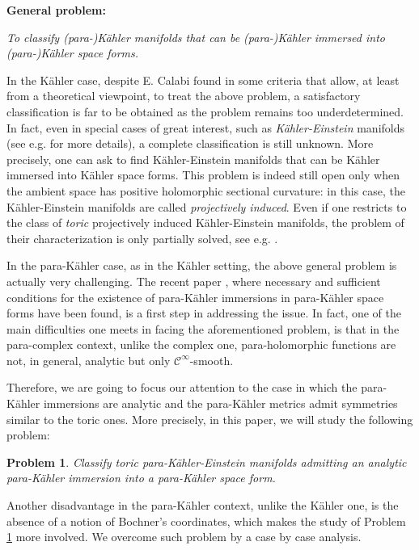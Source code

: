 \documentclass[11pt, reqno]{amsart}
\newtheorem{problem}{Problem}
\newcommand{\de}{\partial}
\newcommand{\D}{\mathds{D}}
\newcommand{\K }{K\"{a}hler }
\newcommand{\KE }{K\"{a}hler-Einstein }
\newcommand{\pk }{para-K\"{a}hler }
\begin{document}
\begin{center}
\textbf{General problem:}

\emph{To classify (para-)\K manifolds that can be (para-)\K immersed into (para-)\K space forms.}
\end{center}

\medskip
\noindent
In the \K case, despite E. Calabi found in \cite{Cal} some criteria that allow, at least from a theoretical viewpoint, to treat  the above problem, a satisfactory classification is far to be obtained as the problem remains too underdetermined.
In fact, even in special cases of great interest, such as \emph{\KE} manifolds (see e.g. \cite{extr,pacific,loizedda, ms2,salis} for more details), a complete classification is still unknown.
More precisely, one can ask to find \KE manifolds that can be \K immersed into \K space forms.
This problem is indeed still open only when the ambient space has positive holomorphic sectional curvature: in this case, the \KE manifolds are called \emph{projectively induced}. Even if one restricts to the class of \emph{toric} projectively induced \KE manifolds, the problem of their characterization is only partially solved, see e.g. \cite{loitoric, ny, ms2}. 




In the \pk case, as in the \K setting, the above general problem is actually very challenging. The recent paper \cite{MSpK}, where necessary and sufficient conditions for the existence of \pk  immersions in \pk space forms have been found, is a first step in addressing the issue. 
In fact, one of the main difficulties one meets in facing the aforementioned problem, is that in the para-complex context, unlike the complex one, para-holomorphic functions are not, in general, analytic but only $\mathcal{C}^\infty$-smooth. 

Therefore, we are going to focus our attention to the case in which the \pk immersions are analytic and the \pk metrics admit symmetries similar to the toric ones. More precisely, in this paper, we will study the following problem:
%


\begin{problem}\label{toricprob}
Classify toric para-\KE manifolds 
admitting an analytic \pk  immersion into a \pk space form.
\end{problem}
%
%
Another disadvantage in the \pk context, unlike the \K one,  is the absence of a notion of Bochner's coordinates, which makes the study of Problem \ref{toricprob} more involved. We overcome such problem by a case by case analysis.
\end{document}
